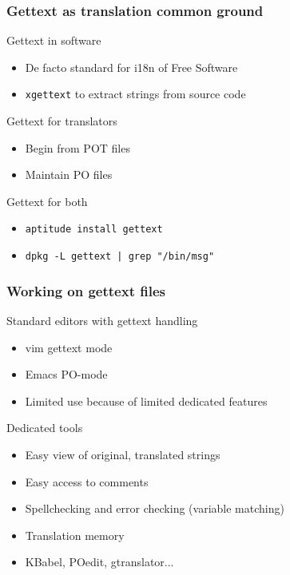 \documentclass{beamer}
\begin{document}
\begin{frame}
  \frametitle{Gettext as translation common ground}
	\begin{block}
		{Gettext in software}
		\begin{itemize}
		\item
			De facto standard for i18n of Free Software
		\item
			\texttt{xgettext} to extract strings from source code
		\end{itemize}
	\end{block}
	\begin{block}
		{Gettext for translators}
		\begin{itemize}
		\item
			Begin from POT files
		\item
			Maintain PO files
		\end{itemize}
	\end{block}
	\begin{block}
		{Gettext for both}
		\begin{itemize}
		\item
			\texttt{aptitude install gettext}
		\item
			\texttt{dpkg -L gettext | grep "/bin/msg"}
		\end{itemize}
	\end{block}
\end{frame}

\begin{frame}
  \frametitle{Working on gettext files}
	\begin{block}
		{Standard editors with gettext handling}
		\begin{itemize}
		\item
			vim gettext mode
		\item
			Emacs PO-mode
		\item
			Limited use because of limited dedicated features
		\end{itemize}
	\end{block}
	\begin{block}
		{Dedicated tools}
		\begin{itemize}
		\item
			Easy view of original, translated strings
		\item
			Easy access to comments
		\item
			Spellchecking and error checking (variable matching)
		\item
			Translation memory
		\item
			KBabel, POedit, gtranslator...
		\end{itemize}
	\end{block}
\end{frame}
\end{document}

